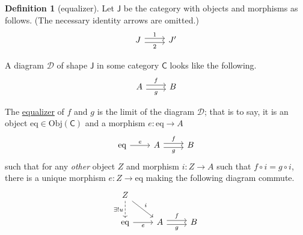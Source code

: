 \documentclass[a4paper,10pt]{scrreprt}
\newcommand{\defn}[1]{\ul{#1}}
\newcommand{\Obj}{\mathrm{Obj}}
\theoremstyle{definition}
\newtheorem{definition}{Definition}[section]
\newtheorem{example}{Example}[section]
\theoremstyle{plain}
\theoremstyle{remark}
\begin{document}
\begin{definition}[equalizer]
  \label{def:equalizer}
  Let $\mathsf{J}$ be the category with objects and morphisms as follows. (The necessary identity arrows are omitted.)
  \begin{equation*}
    \begin{tikzcd}
      J
      \arrow[r, shift left, "1"]
      \arrow[r, shift right, swap, "2"]
      & J'
    \end{tikzcd}
  \end{equation*}

  A diagram $\mathcal{D}$ of shape $\mathsf{J}$ in some category $\mathsf{C}$ looks like the following.
  \begin{equation*}
    \begin{tikzcd}
      A 
      \arrow[r, shift left, "f"]
      \arrow[r, shift right, swap, "g"]
      & B
    \end{tikzcd}
  \end{equation*}

  The \defn{equalizer} of $f$ and $g$ is the limit of the diagram $\mathcal{D}$; that is to say, it is an object $\mathrm{eq} \in \Obj(\mathsf{C})$ and a morphism $e\colon \mathrm{eq} \to A$
  \begin{equation*}
    \begin{tikzcd}
      \mathrm{eq}
      \arrow[r, "e"]
      & A
      \arrow[r, shift left, "f"]
      \arrow[r, shift right, swap, "g"]
      & B
    \end{tikzcd}
  \end{equation*}
  such that for any \emph{other} object $Z$ and morphism $i\colon Z \to A$ such that $f \circ i = g \circ i$, there is a unique morphism $e\colon Z \to \mathrm{eq}$ making the following diagram commute.
  \begin{equation*}
    \begin{tikzcd}
      Z 
      \arrow[d, swap, dashed, "\exists! u"]
      \arrow[dr, "i"]
      \\
      \mathrm{eq}
      \arrow[r, swap, "e"]
      & A
      \arrow[r, shift left, "f"]
      \arrow[r, shift right, swap, "g"]
      & B
    \end{tikzcd}
  \end{equation*}
\end{definition}
\end{document}
